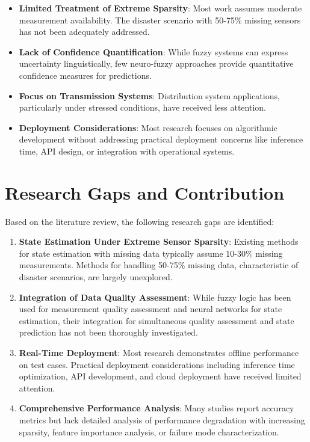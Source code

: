 \documentclass[12pt,a4paper]{report}
\begin{document}
\begin{itemize}
    \item \textbf{Limited Treatment of Extreme Sparsity}: Most work assumes moderate measurement availability. The disaster scenario with 50-75\% missing sensors has not been adequately addressed.
    
    \item \textbf{Lack of Confidence Quantification}: While fuzzy systems can express uncertainty linguistically, few neuro-fuzzy approaches provide quantitative confidence measures for predictions.
    
    \item \textbf{Focus on Transmission Systems}: Distribution system applications, particularly under stressed conditions, have received less attention.
    
    \item \textbf{Deployment Considerations}: Most research focuses on algorithmic development without addressing practical deployment concerns like inference time, API design, or integration with operational systems.
\end{itemize}

\section{Research Gaps and Contribution}

Based on the literature review, the following research gaps are identified:

\begin{enumerate}
    \item \textbf{State Estimation Under Extreme Sensor Sparsity}: Existing methods for state estimation with missing data typically assume 10-30\% missing measurements. Methods for handling 50-75\% missing data, characteristic of disaster scenarios, are largely unexplored.
    
    \item \textbf{Integration of Data Quality Assessment}: While fuzzy logic has been used for measurement quality assessment and neural networks for state estimation, their integration for simultaneous quality assessment and state prediction has not been thoroughly investigated.
    
    \item \textbf{Real-Time Deployment}: Most research demonstrates offline performance on test cases. Practical deployment considerations including inference time optimization, API development, and cloud deployment have received limited attention.
    
    \item \textbf{Comprehensive Performance Analysis}: Many studies report accuracy metrics but lack detailed analysis of performance degradation with increasing sparsity, feature importance analysis, or failure mode characterization.
\end{enumerate}
\end{document}
